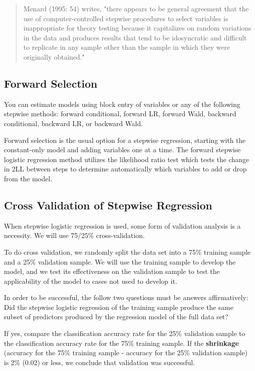 \documentclass[a4paper,12pt]{article}
\begin{document}
\begin{quote}
	Menard (1995: 54) writes, "there appears to be general agreement that the use of computer-controlled stepwise procedures to select variables is inappropriate for theory testing because it capitalizes on random variations in the data and produces results that tend to be idosyncratic and difficult to replicate in any sample other than the sample in which they were originally obtained."
\end{quote}
\subsection*{Forward Selection}
You can estimate models using block entry of variables or any of the following stepwise
methods: forward conditional, forward LR, forward Wald, backward conditional, backward
LR, or backward Wald.


Forward selection is the usual option for a stepwise regression,
starting with the constant-only model and adding variables one at a time. The forward
stepwise logistic regression method utilizes the likelihood ratio test which tests the change in 2LL between steps to determine automatically which variables to add or drop from the model.

\subsection*{Cross Validation of Stepwise Regression}
When stepwise logistic regression is used, some form of validation analysis is a necessity. We will use 75/25\% cross-validation.

To do cross validation, we randomly split the data set into a 75\% training sample and a 25\% validation sample. We will use the training sample to develop the model, and we test its effectiveness on the validation sample to test the applicability of the model to cases not used to develop it.

In order to be successful, the follow two questions must be answers affirmatively:
Did the stepwise logistic regression of the training sample produce the same subset of predictors produced by the regression model of the full data set?

If yes, compare the classification accuracy rate for the 25\% validation sample to the classification accuracy rate for the 75\% training sample. If the \textbf{shrinkage} (accuracy for the 75\% training sample - accuracy for the 25\% validation sample) is 2\% (0.02) or less, we conclude that validation was successful.
\end{document}
